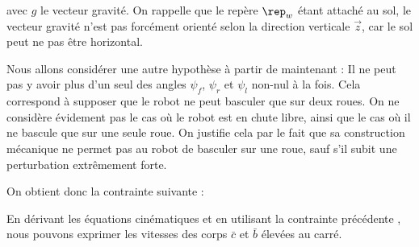 					avec $g$ le vecteur gravité. On rappelle que le repère $\rep_w$ étant attaché au sol, le vecteur gravité n'est pas forcément orienté selon la direction verticale $\vec{z}$, car le sol peut ne pas être horizontal.
					
					
					Nous allons considérer une autre hypothèse à partir de maintenant : Il ne peut pas y avoir plus d'un seul des angles $\psi_f$, $\psi_r$ et $\psi_l$ non-nul à la fois. 
					Cela correspond à supposer que le robot ne peut basculer que sur deux roues. On ne considère évidement pas le cas où le robot est en chute libre, ainsi que le cas où il ne bascule que sur une seule roue.
					On justifie cela par le fait que sa construction mécanique ne permet pas au robot de basculer sur une roue, sauf s'il subit une perturbation extrêmement forte.
					
					
					On obtient donc la contrainte suivante :
					
				
					En dérivant les équations cinématiques  et en utilisant la contrainte précédente , nous pouvons exprimer les vitesses des corps $\bar{c}$ et $\bar{b}$ élevées au carré.
			
